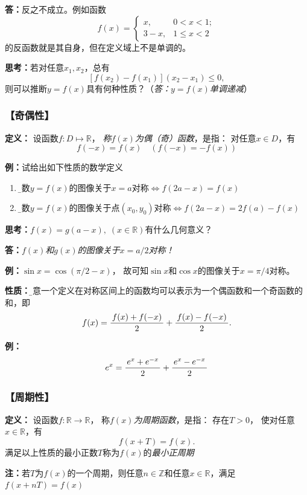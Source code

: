 {\bf 答：}反之不成立。例如函数
$$f(x)=\left\{\begin{array}{ll}
	x,&0<x<1;\\
	3-x,&1\leq x<2
\end{array}\right.$$
的反函数就是其自身，但在定义域上不是单调的。

{\b {\bf 思考：}若对任意$x_1,x_2$，总有
$$[f(x_2)-f(x_1)](x_2-x_1)\leq 0,$$
则可以推断$y=f(x)$具有何种性质？\hfill（{\it 答：$y=f(x)$单调递减}）}

\subsubsection{【奇偶性】}

{{\bf 定义：}}
	设函数$f:D\mapsto\mathbb{R}$，
	{\it 称$f(x)$为偶（奇）函数}，是指： 对任意$x\in D$，有
	$$f(-x)=f(x)\quad(f(-x)=-f(x))$$

{{\bf 例：}试给出如下性质的数学定义}
\begin{enumerate}[(1)]
  \setlength{\itemindent}{1cm}
  \item {\b 函数$y=f(x)$的图像关于$x=a$对称\quad$\Leftrightarrow f(2a-x)=f(x)$}
  \item {\b 函数$y=f(x)$的图像关于点$(x_0,y_0)$对称\quad$\Leftrightarrow f(2a-x)=2f(a)-f(x)$}
\end{enumerate}

{\b {\bf 思考：}$f(x)=g(a-x),\;(x\in\mathbb{R})$有什么几何意义？

{\bf 答：}{\it $f(x)$和$g(x)$的图像关于$x=a/2$对称！}}

{\bf 例：}$\sin x=\cos(\pi/2-x)$，
故可知$\sin x$和$\cos x$的图像关于$x=\pi/4$对称。

{\bf 性质：}{\b 任意一个定义在对称区间上的函数均可以表示为一个偶函数和一个奇函数的和}，即
$$f(x)=\displaystyle\frac{\,{f(x)+f(-x)}\,}{\,{2}\,}+\displaystyle\frac{\,{f(x)-f(-x)}\,}{\,{2}\,}.$$

{\bf 例：}
$$e^x=\displaystyle\frac{\,{e^x+e^{-x}}\,}{\,{2}\,}+\displaystyle\frac{\,{e^x-e^{-x}}\,}{\,{2}\,}$$

\subsubsection{【周期性】}

{{\bf 定义：}}
设函数$f:\mathbb{R}\to\mathbb{R}$，
称{\it $f(x)$为周期函数}，是指： 存在$T>0$，
使对任意$x\in\mathbb{R}$，有
$$f(x+T)=f(x).$$
 满足以上性质的最小正数$T$称为$f(x)$的{\it 最小正周期}
		 
{\bf 注：}若$T$为$f(x)$的一个周期，则任意$n\in\mathbb{Z}$和任意$x\in\mathbb{R}$，满足
$f(x+nT)=f(x)$

